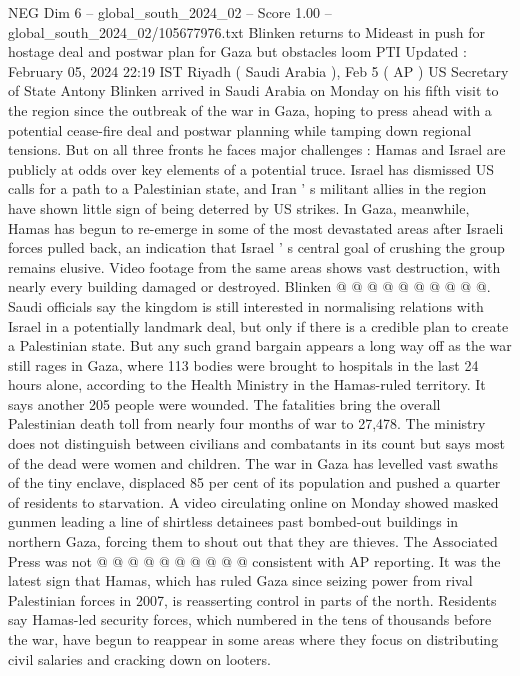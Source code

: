 \begin{textsample}{NEG Dim 6 – global\_south\_2024\_02 – Score 1.00 – global\_south\_2024\_02/105677976.txt}  \label{ex:f6_neg_285}
Blinken returns to Mideast in push for hostage deal and postwar plan for Gaza but obstacles loom PTI Updated : February 05, 2024 22:19 IST Riyadh ( Saudi Arabia ), Feb 5 ( AP ) US Secretary of State Antony Blinken arrived in Saudi Arabia on Monday on his fifth visit to the region since the outbreak of the war in Gaza, hoping to press ahead with a potential cease-fire deal and postwar planning while tamping down regional tensions.
But on all three fronts he faces major challenges : Hamas and Israel are publicly at odds over key elements of a potential truce.
Israel has dismissed US calls for a path to a Palestinian state, and Iran ' s militant allies in the region have shown little sign of being deterred by US strikes.
In Gaza, meanwhile, Hamas has begun to re-emerge in some of the most devastated areas after Israeli forces pulled back, an indication that Israel ' s central goal of crushing the group remains elusive.
Video footage from the same areas shows vast destruction, with nearly every building damaged or destroyed.
Blinken @ @ @ @ @ @ @ @ @ @.
Saudi officials say the kingdom is still interested in normalising relations with Israel in a potentially landmark deal, but only if there is a credible plan to create a Palestinian state.
But any such grand bargain appears a long way off as the war still rages in Gaza, where 113 bodies were brought to hospitals in the last 24 hours alone, according to the Health Ministry in the Hamas-ruled territory.
It says another 205 people were wounded.
The fatalities bring the overall Palestinian death toll from nearly four months of war to 27,478.
The ministry does not distinguish between civilians and combatants in its count but says most of the dead were women and children.
The war in Gaza has levelled vast swaths of the tiny enclave, displaced 85 per cent of its population and pushed a quarter of residents to starvation.
A video circulating online on Monday showed masked gunmen leading a line of shirtless detainees past bombed-out buildings in northern Gaza, forcing them to shout out that they are thieves.
The Associated Press was not @ @ @ @ @ @ @ @ @ @ consistent with AP reporting.
It was the latest sign that Hamas, which has ruled Gaza since seizing power from rival Palestinian forces in 2007, is reasserting control in parts of the north.
Residents say Hamas-led security forces, which numbered in the tens of thousands before the war, have begun to reappear in some areas where they focus on distributing civil salaries and cracking down on looters.

\end{textsample}
